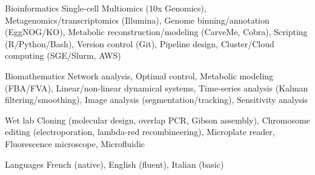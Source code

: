 

\begin{cvskills}

  \cvskill
    {Bioinformatics} %
    {
    Single-cell Multiomics (10x Genomics), Metagenomics/transcriptomics (Illumina), Genome binning/annotation (EggNOG/KO), \linebreak
    Metabolic reconstruction/modeling (CarveMe, Cobra), Scripting (R/Python/Bash), Version control (Git), Pipeline design, \linebreak Cluster/Cloud computing (SGE/Slurm, AWS)
    } %


  \cvskill
    {Biomathematics} %
    {Network analysis, Optimal control, Metabolic modeling (FBA/FVA), Linear/non-linear dynamical systems, \linebreak Time-series analysis (Kalman filtering/smoothing), Image analysis (segmentation/tracking), Sensitivity analysis} %

  \cvskill
    {Wet lab} %
    {Cloning (molecular design, overlap PCR, Gibson assembly), Chromosome editing (electroporation, \linebreak lambda-red recombineering), Microplate reader, Fluorescence microscope, Microfluidic} %

  \cvskill
    {Languages} %
    {French (native), English (fluent), Italian (basic) } %

\end{cvskills}